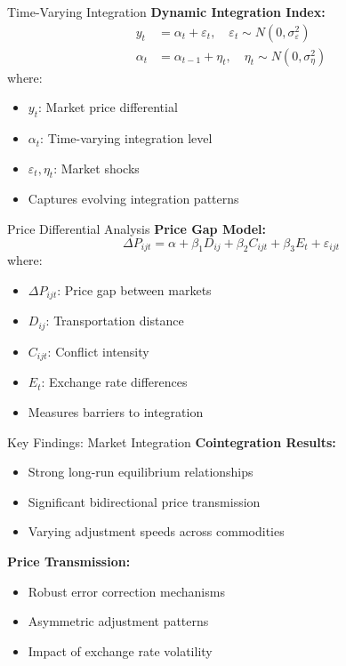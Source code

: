 \documentclass{beamer}
\begin{document}
\begin{frame}{Time-Varying Integration}
    \textbf{Dynamic Integration Index:}
    \begin{equation*}
    \begin{aligned}
    y_t &= \alpha_t + \varepsilon_t, \quad \varepsilon_t \sim N(0, \sigma_\varepsilon^2) \\
    \alpha_t &= \alpha_{t-1} + \eta_t, \quad \eta_t \sim N(0, \sigma_\eta^2)
    \end{aligned}
    \end{equation*}
    where:
    \begin{itemize}
        \item $y_t$: Market price differential
        \item $\alpha_t$: Time-varying integration level
        \item $\varepsilon_t, \eta_t$: Market shocks
        \item Captures evolving integration patterns
    \end{itemize}
\end{frame}

\begin{frame}{Price Differential Analysis}
    \textbf{Price Gap Model:}
    \begin{equation*}
    \Delta P_{ijt} = \alpha + \beta_1 D_{ij} + \beta_2 C_{ijt} + \beta_3 E_t + \varepsilon_{ijt}
    \end{equation*}
    where:
    \begin{itemize}
        \item $\Delta P_{ijt}$: Price gap between markets
        \item $D_{ij}$: Transportation distance
        \item $C_{ijt}$: Conflict intensity
        \item $E_t$: Exchange rate differences
        \item Measures barriers to integration
    \end{itemize}
\end{frame}

\begin{frame}{Key Findings: Market Integration}
    \textbf{Cointegration Results:}
    \begin{itemize}
        \item Strong long-run equilibrium relationships
        \item Significant bidirectional price transmission
        \item Varying adjustment speeds across commodities
    \end{itemize}
    
    \textbf{Price Transmission:}
    \begin{itemize}
        \item Robust error correction mechanisms
        \item Asymmetric adjustment patterns
        \item Impact of exchange rate volatility
    \end{itemize}
\end{frame}
\end{document}
